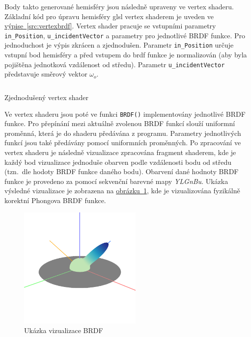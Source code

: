 \documentclass[czech,master]{diploma}
\newcommand{\outVec}{\omega_{o}}
\begin{document}
Body takto generované hemisféry jsou následně upraveny ve vertex shaderu. Základní kód pro úpravu hemisféry glsl vertex shaderem je uveden ve \hyperref[src:vertexbrdf]{výpise~\ref{src:vertexbrdf}}. Vertex shader pracuje se vstupními parametry \texttt{in\_Position}, \texttt{u\_incidentVector} a parametry pro jednotlivé BRDF funkce. Pro jednoduchost je výpis zkrácen a zjednodušen. Parametr \texttt{in\_Position} určuje vstupní bod hemisféry a před vstupem do brdf funkce je normalizován (aby byla pojištěna jednotková vzdálenost od středu). Parametr \texttt{u\_incidentVector} představuje směrový vektor \(\outVec\). \par

\begin{listing}[ht]
  \inputminted{c++}{sampleshader.glsl}
  \caption{Zjednodušený vertex shader}
  \label{src:vertexbrdf}
\end{listing}

Ve vertex shaderu jsou poté ve funkci \texttt{BRDF()} implementovány jednotlivé BRDF funkce. Pro přepínání mezi aktuálně zvolenou BRDF funkcí slouží uniformní proměnná, která je do shaderu předávána z programu. Parametry jednotlivých funkcí jsou také předávány pomocí uniformních proměnných. Po zpracování ve vertex shaderu je následně vizualizace zpracována fragment shaderem, kde je každý bod vizualizace jednoduše obarven podle vzdálenosti bodu od středu (tzn.\ dle hodoty BRDF funkce daného bodu). Obarvení dané hodnoty BRDF funkce je provedeno za pomocí sekvenční barevné mapy \textit{YLGnBu}. Ukázka výsledné vizualizace je zobrazena na \hyperref[fig:brdfExample]{obrázku~\ref{fig:brdfExample}}, kde je vizualizována fyzikálně korektní Phongova BRDF funkce.

\begin{figure}
  \centering
  \includegraphics[width=6cm]{Figures/brdfVizExample.png}
  \caption{Ukázka vizualizace BRDF}%
  \label{fig:brdfExample}%
\end{figure}
\end{document}

